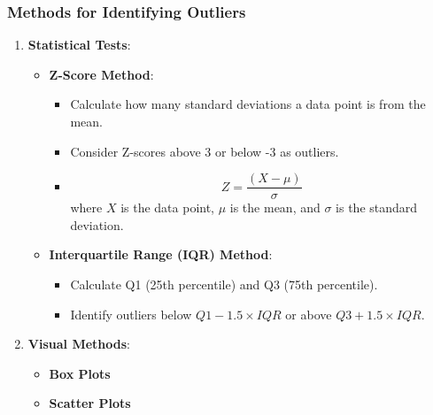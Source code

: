 \documentclass[aspectratio=169]{beamer}
\begin{document}
\begin{frame}[fragile]
    \frametitle{Methods for Identifying Outliers}
    \begin{enumerate}
        \item \textbf{Statistical Tests}:
            \begin{itemize}
                \item \textbf{Z-Score Method}:
                    \begin{itemize}
                        \item Calculate how many standard deviations a data point is from the mean.
                        \item Consider Z-scores above 3 or below -3 as outliers.
                        \item \begin{equation}
                              Z = \frac{(X - \mu)}{\sigma}
                            \end{equation}
                        where $X$ is the data point, $\mu$ is the mean, and $\sigma$ is the standard deviation.
                    \end{itemize}
                \item \textbf{Interquartile Range (IQR) Method}:
                    \begin{itemize}
                        \item Calculate Q1 (25th percentile) and Q3 (75th percentile).
                        \item Identify outliers below $Q1 - 1.5 \times IQR$ or above $Q3 + 1.5 \times IQR$.
                    \end{itemize}
            \end{itemize}
        \item \textbf{Visual Methods}:
            \begin{itemize}
                \item \textbf{Box Plots}
                \item \textbf{Scatter Plots}
            \end{itemize}
    \end{enumerate}
\end{frame}
\end{document}
